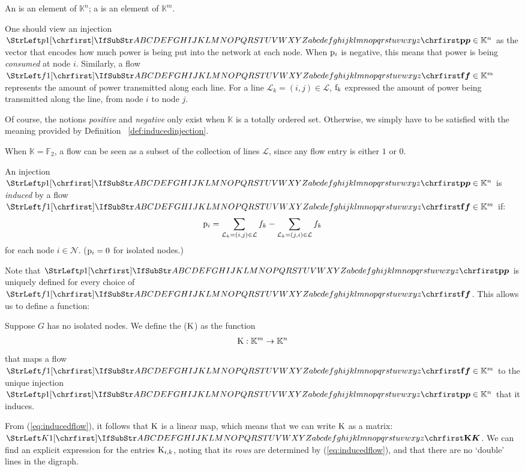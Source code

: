 \documentclass[main.tex]{subfiles}
\begin{document}
\begin{definition}\label{def:injectionandflow}
An  is an element of $\mathbb{K}^n$; a  is an element of $\mathbb{K}^m$.
\end{definition}

One should view an injection $\mat{p} \in \mathbb{K}^n$ as the vector that encodes how much power is being put into the network at each node. When ${\mathrm{p}}_i$ is negative, this means that power is being \emph{consumed} at node $i$. Similarly, a flow $\mat{f} \in \mathbb{K}^m$ represents the amount of power transmitted along each line. For a line $\mathcal{L}_k=(i,j) \in \mathcal{L}$, ${\mathrm{f}}_k$ expressed the amount of power being transmitted along the line, from node $i$ to node $j$.

Of course, the notions \emph{positive} and \emph{negative} only exist when $\mathbb{K}$ is a totally ordered set. Otherwise, we simply have to be satisfied with the meaning provided by Definition~ \ref{def:inducedinjection}.

When $\mathbb{K}=\mathbb{F}_2$, a flow can be seen as a subset of the collection of lines $\mathcal{L}$, since any flow entry is either $1$ or $0$.

\begin{definition}\label{def:inducedinjection}
An injection $\mat{p} \in \mathbb{K}^n$ is \emph{induced} by a flow $\mat{f} \in \mathbb{K}^m$ if:
\begin{gather}
    {\mathrm{p}}_i =
    \sum_{\mathcal{L}_k=(i,j) \in \mathcal{L}} f_k -
    \sum_{\mathcal{L}_k=(j,i) \in \mathcal{L}} f_k \label{eq:inducedflow}
\end{gather}
for each node $i \in \mathcal{N}$. (${\mathrm{p}}_i = 0$ for isolated nodes.)
\end{definition}
Note that $\mat{p}$ is uniquely defined for every choice of $\mat{f}$. This allows us to define a function:
\begin{definition}
Suppose $G$ has no isolated nodes. We define the  ($\text{\textup{K}}$) as the function
\begin{gather*}
    \text{\textup{K}}: \mathbb{K}^m \rightarrow \mathbb{K}^n
\end{gather*}
that maps a flow $\mat{f} \in \mathbb{K}^m$ to the unique injection $\mat{p} \in \mathbb{K}^n$ that it induces.
\end{definition}

From (\ref{eq:inducedflow}), it follows that $\text{\textup{K}}$ is a linear map, which means that we can write $\text{\textup{K}}$ as a matrix: $\mat{K}$. We can find an explicit expression for the entries ${\mathrm{K}}_{i,k}$, noting that its \emph{rows} are determined by (\ref{eq:inducedflow}), and that there are no `double' lines in the digraph.
\end{document}
